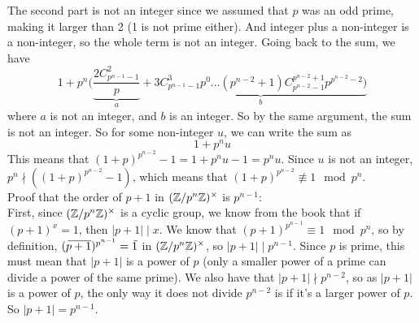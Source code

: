 \documentclass[12pt]{article}
\begin{document}
    The second part is not an integer since we assumed that
    $p$ was an odd prime, making it larger than 2
    (1 is not prime either).
    And integer plus a non-integer is a non-integer,
    so the whole term is not an integer.
    Going back to the sum, we have 
    \[1 + p^n( \underbrace{\dfrac{ 2C_{p^{n-1} - 1}^{2}}{p}}_{a}
    + \underbrace{3C_{p^{n-1} - 1}^{3}p^{0} \dots
    (p^{n-2}+1)C_{p^{n-2} - 1}^{p^{n-2} + 1}p^{p^{n-2}-2})}_{b} \]
    where $a$ is not an integer, and $b$ is an integer.
    So by the same argument, the sum is not an integer.
    So for some non-integer $u$, we can write the sum as
    \[1 + p^nu\]
    This means that $(1 + p)^{p^{n-2}} - 1 = 1 + p^nu - 1
    = p^nu$.
    Since $u$ is not an integer, $p^n \nmid ((1 + p)^{p^{n-2}} - 1)$,
    which means that $(1 + p)^{p^{n-2}} \not\equiv 1 \mod p^n$. \\
    Proof that the order of $p + 1$
    in $(\mathbb{Z}/p^n\mathbb{Z})^\times$ is $p^{n-1}$: \\
    First, since $(\mathbb{Z}/p^n\mathbb{Z})^\times$ is a cyclic group,
    we know from the book that if $(p + 1)^x = 1$,
    then $|p + 1| \mid x$.
    We know that $(p + 1)^{p^{n-1}} \equiv 1 \mod p^n$,
    so by definition, $(\,\overline{\!{p + 1}})^{p^{n-1}} = \,\overline{\!{1}}$
    in $(\mathbb{Z}/p^n\mathbb{Z})^\times$,
    so $|p + 1| \mid p^{n-1}$.
    Since $p$ is prime, this must mean that $|p+1|$ is a power of $p$
    (only a smaller power of a prime can divide a power of the same prime).
    We also have that $|p + 1| \nmid p^{n-2}$,
    so as $|p+1|$ is a power of $p$,
    the only way it does not divide $p^{n-2}$ is if it's
    a larger power of $p$.
    So $|p + 1| = p^{n-1}$.
\end{document}
